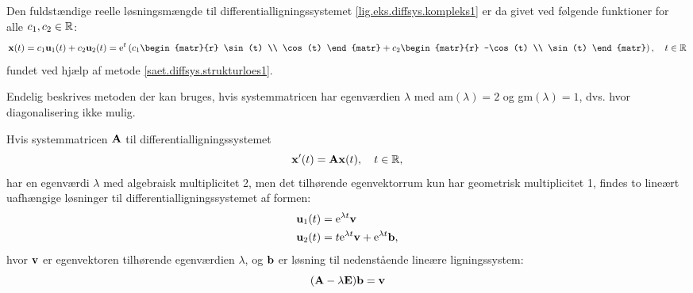 \begin{example}
\begin{equation}
\end{equation}
Den fuldstændige reelle løsningsmængde til differentialligningssystemet \eqref{lig.eks.diffsys.kompleks1} er da givet ved følgende funktioner for alle $ c_1,c_2 \in \mathbb{R} $:
\begin{equation}
\mx(t) = c_1\mathbf u_1(t) + c_2\mathbf u_2(t) = \e^{t} \left(c_1 \begin{matr}{r} \sin(t) \\ \cos(t) \end{matr} + c_2 \begin{matr}{r} -\cos(t) \\ \sin(t) \end{matr} \right), \quad t \in \reel
\end{equation}
fundet ved hjælp af metode \ref{saet.diffsys.strukturloes1}.
\end{example}
Endelig beskrives metoden der kan bruges, hvis systemmatricen har egenværdien $\lambda$ med am$(\lambda)=2$ og gm$(\lambda)=1$, dvs. hvor diagonalisering ikke mulig.

\begin{method} \label{saet.diffsys.dobbeltrod1}
Hvis systemmatricen $ \mathbf{A} $ til differentialligningssystemet
\begin{equation}
\mathbf{x}'(t) = \mathbf{A} \mathbf{x}(t), \quad t \in \mathbb{R},
\end{equation}
har en egenværdi $ \lambda $ med algebraisk multiplicitet 2, men det tilhørende egenvektorrum kun har geometrisk multiplicitet 1, findes to lineært uafhængige løsninger til differentialligningssystemet af formen:
\begin{equation}
\begin{aligned}
\mathbf u_1(t) &= \mathrm{e}^{\lambda t} \mathbf{v} \\
\mathbf u_2(t) &= t \mathrm{e}^{\lambda t} \mathbf{v} + \mathrm{e}^{\lambda t} \mathbf{b},
\end{aligned}
\end{equation}
hvor $ \mathbf{v} $ er egenvektoren tilhørende egenværdien $ \lambda $, og $ \mathbf{b} $ er løsning til nedenstående lineære ligningssystem:
\begin{equation}
(\mathbf{A} - \lambda \mathbf{E})\mathbf{b} = \mathbf{v}
\end{equation}
\end{method}

